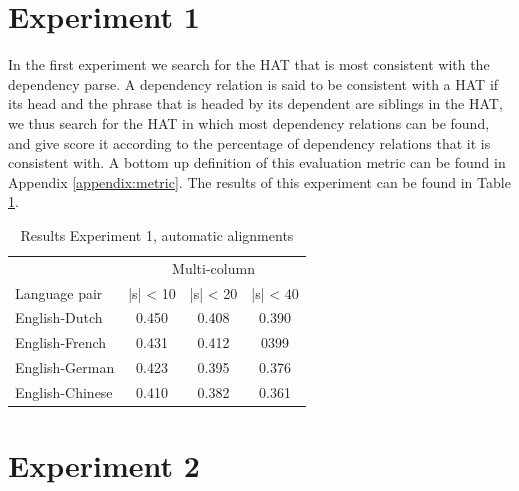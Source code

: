 \documentclass{report}
\theoremstyle{definition}
\theoremstyle{plain}
\begin{document}
\section{Experiment 1}

In the first experiment we search for the HAT that is most consistent with the dependency parse. A dependency relation is said to be consistent with a HAT if its head and the phrase that is headed by its dependent are siblings in the HAT, we thus search for the HAT in which most dependency relations can be found, and give score it according to the percentage of dependency relations that it is consistent with. A bottom up definition of this evaluation metric can be found in Appendix \ref{appendix:metric}. The results of this experiment can be found in Table \ref{tab:scores1}.

\begin{table}[!h]
\begin{tabular}{l|ccc}
& \multicolumn{3}{c}{Multi-column}\\
Language pair & |s| < 10 & |s| < 20 & |s| < 40\\
\hline
English-Dutch & 0.450 & 0.408 & 0.390 \\
English-French & 0.431 & 0.412 & 0399 \\
English-German & 0.423 & 0.395 & 0.376 \\
English-Chinese & 0.410 & 0.382 & 0.361\\
\end{tabular}
\caption{Results Experiment 1, automatic alignments}\label{tab:scores1}
\end{table}


\begin{table}

\end{table}


\section{Experiment 2}








\end{document}
